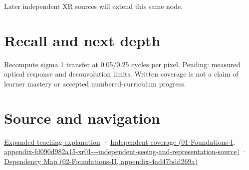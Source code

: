 Later independent XR sources will extend this same node.

\section{Recall and next depth}\label{appendix-8b76b0efd27f-recall-and-next-depth}

Recompute sigma 1 transfer at 0.05/0.25 cycles per pixel. Pending: measured optical response and deconvolution limits. Written coverage is not a claim of learner mastery or accepted numbered-curriculum progress.

\section{Source and navigation}\label{appendix-8b76b0efd27f-source-and-navigation}

\href{Continuous\%20Notes/University\%20-\%20Worlds,\%20Images\%20and\%20Inference\%20-\%20Graphics,\%20Vision\%20and\%20Photography\#A\%20footprint\%20is\%20more\%20meaningful\%20than\%20an\%20isolated\%20pixel\%20center}{Expanded teaching explanation} · \href{../01-Foundations-I/main.pdf\#nameddest=appendix-fd090d982a15-xr01---independent-seeing-and-representation-source}{Independent coverage (01-Foundations-I, appendix-fd090d982a15-xr01-\/-\/-independent-seeing-and-representation-source)} · \href{../02-Foundations-II/main.pdf\#nameddest=appendix-4ad47bdd269a}{Dependency Map (02-Foundations-II, appendix-4ad47bdd269a)}

